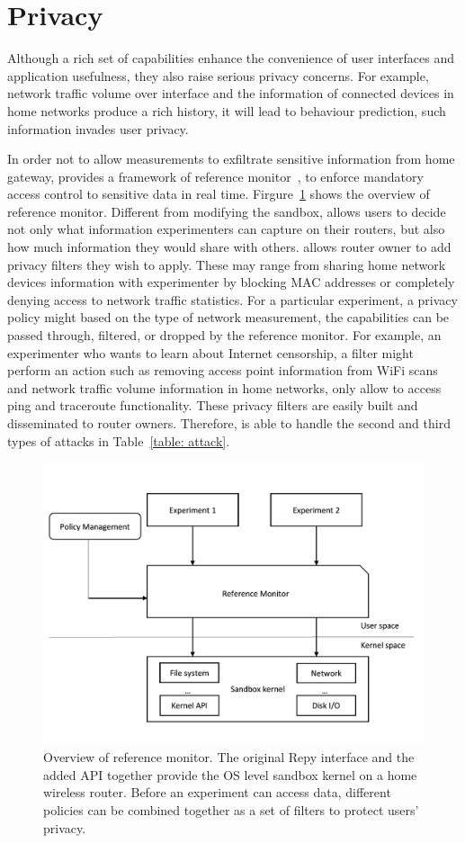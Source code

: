 \section{Privacy}
\label{sec.privacy}
Although a rich set of capabilities enhance the convenience of user interfaces and application usefulness, they also raise serious privacy concerns. For example, network traffic volume over interface and the information of connected devices in home networks produce a rich history, it will lead to behaviour prediction, such information invades user privacy. 

In order not to allow measurements to exfiltrate sensitive information from home gateway, \sysname provides a framework of reference monitor~\cite{ref}, to enforce mandatory access control to sensitive data in real time. Firgure~\ref{fig-reference} shows the overview of reference monitor. Different from modifying the sandbox, \sysname allows users to decide not only what information experimenters can capture on their routers, but also how much information they would share with others. \sysname allows router owner to add privacy filters they wish to apply. These may range from sharing home network devices information with experimenter by blocking MAC addresses or completely denying access to network traffic statistics. For a particular experiment, a privacy policy might based on the type of network measurement, the capabilities can be passed through, filtered, or dropped by the reference monitor. For example, an experimenter who wants to learn about Internet censorship, a filter might perform an action such as removing access point information from WiFi scans and network traffic volume information in home networks, only allow to access ping and traceroute functionality. These privacy filters are easily built and disseminated to router owners. Therefore, \sysname is able to handle the second and third types of attacks in Table~\ref{table: attack}. 

\begin{figure}%
\centering
\includegraphics[width=0.8\columnwidth]{figure/referencemonitor.png}
\caption{Overview of reference monitor. The original Repy interface and the added API together provide the OS level sandbox kernel on a home wireless router. Before an experiment can access data, different policies can be combined together as a set of filters to protect users' privacy.}
\label{fig-reference}
\end{figure}

